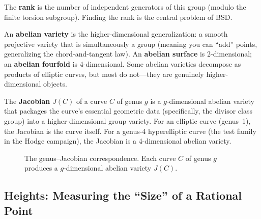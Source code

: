 \documentclass[11pt,twoside,openany]{report}
\theoremstyle{remark}
\begin{document}
The \textbf{rank} is the number of independent generators of this group (modulo the finite torsion subgroup). Finding the rank is the central problem of BSD.

An \textbf{abelian variety} is the higher-dimensional generalization: a smooth projective variety that is simultaneously a group (meaning you can ``add'' points, generalizing the chord-and-tangent law). An \textbf{abelian surface} is 2-dimensional; an \textbf{abelian fourfold} is 4-dimensional. Some abelian varieties decompose as products of elliptic curves, but most do not---they are genuinely higher-dimensional objects.

The \textbf{Jacobian} $J(C)$ of a curve $C$ of genus $g$ is a $g$-dimensional abelian variety that packages the curve's essential geometric data (specifically, the divisor class group) into a higher-dimensional group variety. For an elliptic curve (genus~1), the Jacobian is the curve itself. For a genus-4 hyperelliptic curve (the test family in the Hodge campaign), the Jacobian is a 4-dimensional abelian variety.

\begin{figure}[htbp]
\centering
{}
\caption{The genus--Jacobian correspondence. Each curve $C$ of genus $g$ produces a $g$-dimensional abelian variety $J(C)$.}
\label{fig:genus-jacobian}
\end{figure}

\subsection*{Heights: Measuring the ``Size'' of a Rational Point}
\end{document}

